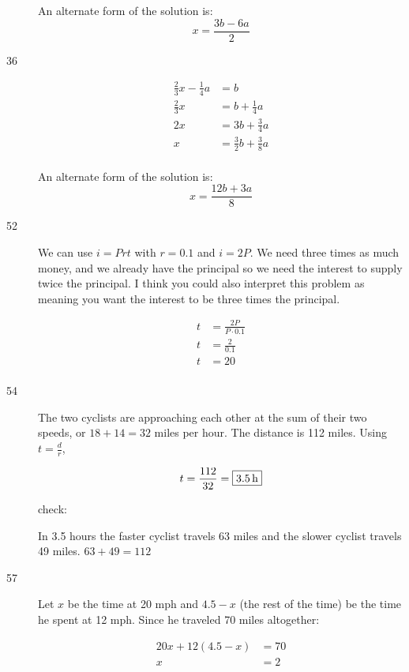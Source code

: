 \documentclass[letterpaper]{exam}
\begin{document}
\begin{description}
      An alternate form of the solution is: 
      \[
        \boxed{ x = \frac{3b - 6a}{2} } 
      \]

      \item[36]
      \begin{align*}
        \frac{2}{3}x - \frac{1}{4}a    & = b \\
        \frac{2}{3}x                   & = b + \frac{1}{4}a \\
        2x                             & = 3b + \frac{3}{4}a \\
        x                              & = \boxed{ \frac{3}{2} b + \frac{3}{8} a } \\
      \end{align*}

      An alternate form of the solution is: 
      \[
        \boxed{ x = \frac{12b + 3a}{8} }
      \]

      \item[52] We can use $i = Prt$ with $r = 0.1$ and $i = 2P$.  We need three times as much money, and we already have
        the principal so we need the interest to supply twice the principal.  I think you could also interpret this
        problem as meaning you want the interest to be three times the principal.

        \begin{align*}
          t & = \frac{2P}{P \cdot 0.1} \\
          t & = \frac{2}{0.1} \\
          t & = \boxed{ 20 } \\
        \end{align*}

      \item[54] The two cyclists are approaching each other at the sum of their two speeds, or \(18 + 14 = 32\) miles per
        hour.  The distance is 112 miles.  Using $t = \frac{d}{r}$, 
        
        \[
          t = \frac{112}{32} = \boxed{ \unit[3.5]{h} }
        \]

        check:
        
        In 3.5 hours the faster cyclist travels 63 miles and the slower cyclist travels 49 miles.  
        $63 + 49 = 112$

      \item[57] Let $x$ be the time at 20 mph and $4.5 - x$ (the rest of the time) be the time he spent at 12 mph.  Since he
        traveled 70 miles altogether:

        \begin{align*}
          20x + 12(4.5 - x) & = 70 \\
          x                 & = \boxed{ 2 } \\
        \end{align*}


\end{description}
\end{document}
